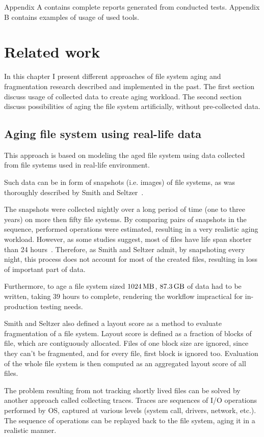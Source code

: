 \documentclass[
  color, %
  table, %
  lof,   %
  lot,   %
]{fithesis3}
\begin{document}
Appendix A contains complete reports generated from conducted tests. Appendix B contains examples of usage of used tools.  

\chapter{Related work}
In this chapter I present different approaches of file system aging and fragmentation research described and implemented in the past. The first section discuss usage of collected data to create aging workload. The second section discuss possibilities of aging the file system artificially, without pre-collected data.

\section{Aging file system using real-life data}
This approach is based on modeling the aged file system using data collected from file systems used in real-life environment.

Such data can be in form of snapshots (i.e. images) of file systems, as was thoroughly described by Smith and Seltzer~\cite{Smith:1997:FSA:258623.258689}.

The snapshots were collected nightly over a long period of time (one to three years) on more then fifty file systems. By comparing pairs of snapshots in the sequence, performed operations were estimated, resulting in a very realistic aging workload. However, as some studies suggest, most of files have life span shorter than 24 hours~\cite{Ousterhout:1985:TAU:323647.323631}. Therefore, as Smith and Seltzer admit, by snapshoting every night, this process does not account for most of the created files, resulting in loss of important part of data.

Furthermore, to age a file system sized $\SI{1024}{\mega\byte}$, $\SI{87.3}{\giga\byte}$ of data had to be written, taking 39 hours to complete, rendering the workflow impractical for in-production testing needs.

Smith and Seltzer also defined a layout score as a method to evaluate fragmentation of a file system. Layout score is defined as a fraction of blocks of file, which are contiguously allocated. Files of one block size are ignored, since they can't be fragmented, and for every file, first block is ignored too. Evaluation of the whole file system is then computed as an aggregated layout score of all files.

The problem resulting from not tracking shortly lived files can be solved by another approach called collecting traces. Traces are sequences of I/O operations performed by OS, captured at various levels (system call, drivers, network, etc.). The sequence of operations can be replayed back to the file system, aging it in a realistic manner.
\end{document}
